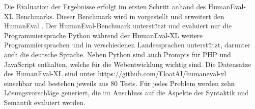 Die Evaluation der Ergebnisse erfolgt im ersten Schritt anhand des HumanEval-XL Benchmarks. Dieser Benchmark wird in \cite{peng-2024} vorgestellt und erweitert den HumanEval \cite{chen-2021}. Der HumanEval-Benchmark unterstützt und evaluiert nur die Programmiersprache Python während der HumanEval-XL weitere Programmiersprachen und in verschiedenen Landessprachen unterstützt, darunter auch die deutsche Sprache. Neben Python sind auch Prompts für PHP und JavaScript enthalten, welche für die Webentwicklung wichtig sind. Die Datensätze des HumanEval-XL sind unter \href{https://github.com/FloatAI/humaneval-xl}{https://github.com/FloatAI/humaneval-xl} einsehbar und bestehen jeweils aus 80 Tests. Für jedes Problem werden zehn Lösungsvorschläge generiert, die im Anschluss auf die Aspekte der Syntaktik und Semantik evaluiert werden.\vspace{0.2cm}






